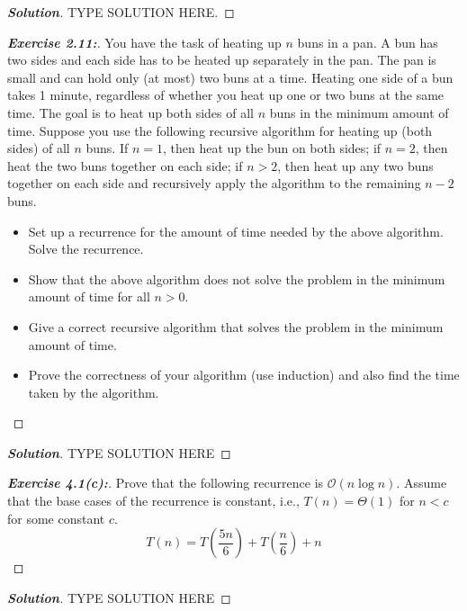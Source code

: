 \documentclass[a4paper]{article}
\newenvironment{solution}{\begin{proof}[\textnormal{\textbf{Solution}}]}{\end{proof}}
\newenvironment{exercise}[1]{\begin{proof}[\textnormal{\textbf{Exercise #1:}}]\renewcommand{\qedsymbol}{}}{\end{proof}}
\newcommand{\bigO}[1]{\mathcal{O}\left(#1\right)}
\newcommand{\bigTh}[1]{\Theta\left(#1\right)}
\begin{document}
\begin{solution}
    TYPE SOLUTION HERE.
\end{solution}

\begin{exercise}{2.11}

    You have the task of heating up \(n\) buns in a pan. A bun has two sides and each side has to be heated up separately in the pan. The pan is small and can hold only (at most) two buns at a time. Heating one side of a bun takes 1 minute, regardless of whether you heat up one or two buns at the same time. The goal is to heat up both sides of all \(n\) buns in the minimum amount of time. Suppose you use the following recursive algorithm for heating up (both sides) of all \(n\) buns. If \(n = 1\), then heat up the bun on both sides;  if \(n = 2\), then heat the two buns together on each side; if \(n > 2\), then heat up any two buns together on each side and recursively apply the algorithm to the remaining \(n − 2\) buns.

    \begin{itemize}
        \item Set up a recurrence for the amount of time needed by the above algorithm. Solve the recurrence.
        \item Show that the above algorithm does not solve the problem in the minimum amount of time for all \(n >0\).
        \item Give a correct recursive algorithm that solves the problem in the minimum amount of time.
        \item Prove the correctness of your algorithm (use induction) and also find the time taken by the algorithm.
    \end{itemize}
\end{exercise}

\begin{solution}
    TYPE SOLUTION HERE
\end{solution}

\begin{exercise}{4.1(c)}
    Prove that the following recurrence is \(\bigO{n\log{n}}\). Assume that the base cases of the recurrence is constant, i.e., \(T(n) = \bigTh{1}\) for \(n < c\) for some constant \(c\).
    \[T(n) = T\left(\frac{5n}{6}\right) + T\left(\frac{n}{6}\right) + n\]
\end{exercise}

\begin{solution}
    TYPE SOLUTION HERE
\end{solution}
\end{document}
